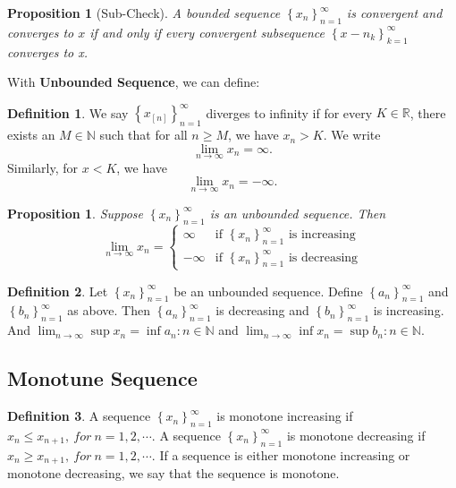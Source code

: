 \documentclass{article}
\newtheorem{prop}[theorem]{Proposition}
\theoremstyle{definition}
\newtheorem{defi}{Definition}[section]
\begin{document}
\begin{prop}[Sub-Check]
A bounded sequence $\left\{x_{n}\right\}_{n=1}^{\infty}$ is convergent and converges to $x$ if and only if every convergent subsequence $\left\{x-{n_{k}}\right\}_{k=1}^{\infty}$ converges to x.
\end{prop}

With \textbf{Unbounded Sequence}, we can define:
\begin{defi}
    We say $\left\{x_[n]\right\}_{n=1}^{\infty}$ diverges to infinity if for every $K\in\mathbb{R}$, there exists an
    $M\in\mathbb{N}$ such that for all $n\geq M$, we have $x_{n}>K$. We write 
    $$\lim_{n\rightarrow \infty} x_{n}=\infty.$$
    Similarly, for $x<K$, we have 
    $$\lim_{n\rightarrow \infty} x_{n}=-\infty.$$
\end{defi}

\begin{prop}
    Suppose $\left\{x_{n}\right\}_{n=1}^{\infty}$ is an unbounded sequence. Then 
    \[
    \lim_{n\to\infty} x_{n} =
    \begin{cases}
    \infty & \text{if } \left\{x_{n}\right\}_{n=1}^{\infty} \text{ is increasing} \\
    -\infty & \text{if } \left\{x_{n}\right\}_{n=1}^{\infty} \text{ is decreasing}
    \end{cases}
    \]
\end{prop}

\begin{defi}
Let $\left\{x_{n}\right\}_{n=1}^{\infty}$ be an unbounded sequence. Define $\left\{a_{n}\right\}_{n=1}^{\infty}$ and $\left\{b_{n}\right\}_{n=1}^{\infty}$ as above.
Then $\left\{a_{n}\right\}_{n=1}^{\infty}$ is decreasing and $\left\{b_{n}\right\}_{n=1}^{\infty}$ is increasing. And $\lim_{n\to\infty} \sup x_{n}=\inf {a_{n}:n\in\mathbb{N}}$ and $\lim_{n\to\infty} \inf x_{n}=\sup {b_{n}:n\in\mathbb{N}}$.
\end{defi}

\subsection{Monotune Sequence}

\begin{defi}
A sequence $\left\{x_{n}\right\}_{n=1}^{\infty}$ is monotone increasing if ${x_{n}\leq x_{n+1}},\ for\ n=1,2,\cdots$.
A sequence $\left\{x_{n}\right\}_{n=1}^{\infty}$ is monotone decreasing if ${x_{n}\geq x_{n+1}},\ for\ n=1,2,\cdots$.
If a sequence is either monotone increasing or monotone decreasing, we say that the sequence is monotone.
\end{defi}
\end{document}
